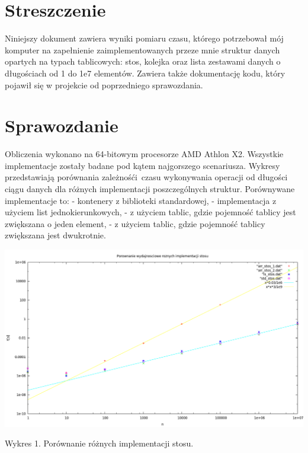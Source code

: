 \part{Streszczenie}
Niniejszy dokument zawiera wyniki pomiaru czasu, którego potrzebował mój komputer na zapełnienie zaimplementowanych przeze mnie struktur danych opartych na typach tablicowych: stos, kolejka oraz lista zestawami danych o długościach od 1 do 1e7 elementów. Zawiera także dokumentację kodu, który pojawił się w projekcie od poprzedniego sprawozdania.

\part{Sprawozdanie}
Obliczenia wykonano na 64-bitowym procesorze AMD Athlon X2. Wszystkie implementacje zostały badane pod kątem najgorszego scenariusza. Wykresy przedstawiają porównania zależnośći czasu wykonywania operacji od długości ciągu danych dla różnych implementacji poszczególnych struktur. Porównywane implementacje to: \newline
- kontenery z biblioteki standardowej, \newline
- implementacja z użyciem list jednokierunkowych, \newline
- z użyciem tablic, gdzie pojemność tablicy jest zwiększana o jeden element,\newline
- z użyciem tablic, gdzie pojemność tablicy zwiększana jest dwukrotnie.
\vspace{0.5cm}
\newpage
\centerline{\includegraphics[width=\textwidth,height=\textheight, keepaspectratio]{stos.png}}
Wykres 1. Porównanie różnych implementacji stosu.
\newline
